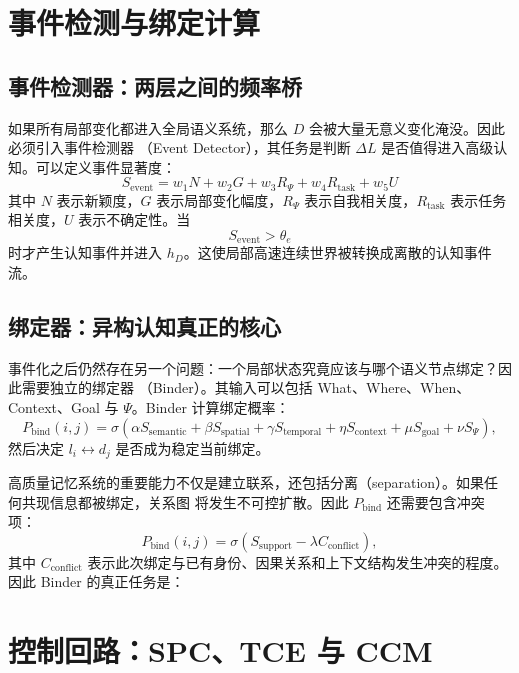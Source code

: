 \section{事件检测与绑定计算}

\subsection{事件检测器：两层之间的频率桥}

如果所有局部变化都进入全局语义系统，那么 $D$ 会被大量无意义变化淹没。因此必须引入事件检测器
（Event Detector），其任务是判断 $\Delta L$ 是否值得进入高级认知。可以定义事件显著度：
\[
\boxed{
S_{\mathrm{event}}
=
w_1N+w_2G+w_3R_\Psi+w_4R_{\mathrm{task}}+w_5U
}
\]
其中 $N$ 表示新颖度，$G$ 表示局部变化幅度，$R_\Psi$ 表示自我相关度，$R_{\mathrm{task}}$ 表示任务
相关度，$U$ 表示不确定性。当
\[
S_{\mathrm{event}}>\theta_e
\]
时才产生认知事件并进入 $h_D$。这使局部高速连续世界被转换成离散的认知事件流。

\subsection{绑定器：异构认知真正的核心}

事件化之后仍然存在另一个问题：一个局部状态究竟应该与哪个语义节点绑定？因此需要独立的绑定器
（Binder）。其输入可以包括 What、Where、When、Context、Goal 与 $\Psi$。Binder 计算绑定概率：
\[
P_{\mathrm{bind}}(i,j)
=
\sigma\!\left(
\alpha S_{\mathrm{semantic}}
+\beta S_{\mathrm{spatial}}
+\gamma S_{\mathrm{temporal}}
+\eta S_{\mathrm{context}}
+\mu S_{\mathrm{goal}}
+\nu S_\Psi
\right),
\]
然后决定 $l_i\leftrightarrow d_j$ 是否成为稳定当前绑定。

高质量记忆系统的重要能力不仅是建立联系，还包括分离（separation）。如果任何共现信息都被绑定，关系图
将发生不可控扩散。因此 $P_{\mathrm{bind}}$ 还需要包含冲突项：
\[
P_{\mathrm{bind}}(i,j)
=
\sigma\!\left(
S_{\mathrm{support}}-\lambda C_{\mathrm{conflict}}
\right),
\]
其中 $C_{\mathrm{conflict}}$ 表示此次绑定与已有身份、因果关系和上下文结构发生冲突的程度。因此
Binder 的真正任务是：

\begin{statementbox}
\centering
{}
\end{statementbox}

\section{控制回路：SPC、TCE 与 CCM}

